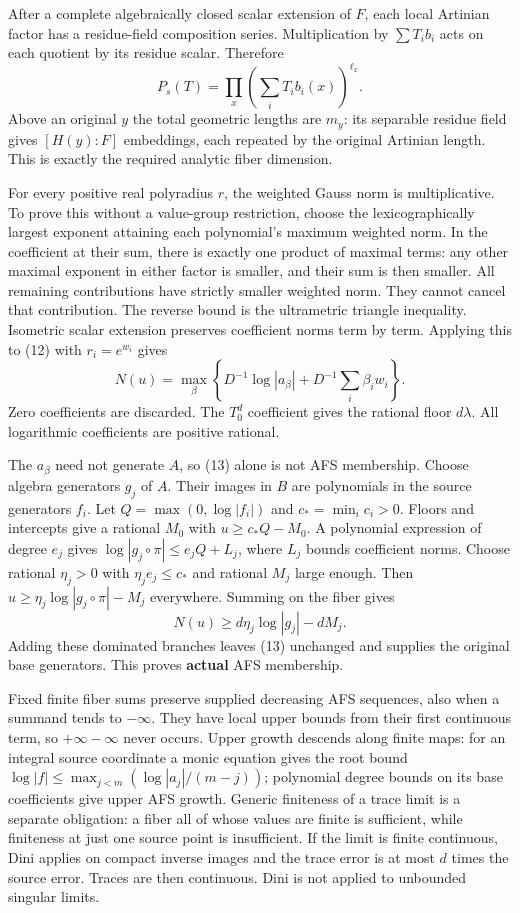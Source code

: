 \documentclass[
  11pt,
]{article}
\begin{document}
After a complete algebraically closed scalar extension of \(F\), each
local Artinian factor has a residue-field composition series.
Multiplication by \(\sum T_i b_i\) acts on each quotient by its residue
scalar. Therefore
\[P_s(T)=\prod_x\left(\sum_iT_i b_i(x)\right)^{\ell_x}.\] Above an
original \(y\) the total geometric lengths are \(m_y\): its separable
residue field gives \([H(y):F]\) embeddings, each repeated by the
original Artinian length. This is exactly the required analytic fiber
dimension.

For every positive real polyradius \(r\), the weighted Gauss norm is
multiplicative. To prove this without a value-group restriction, choose
the lexicographically largest exponent attaining each polynomial's
maximum weighted norm. In the coefficient at their sum, there is exactly
one product of maximal terms: any other maximal exponent in either
factor is smaller, and their sum is then smaller. All remaining
contributions have strictly smaller weighted norm. They cannot cancel
that contribution. The reverse bound is the ultrametric triangle
inequality. Isometric scalar extension preserves coefficient norms term
by term. Applying this to (12) with \(r_i=e^{w_i}\) gives \[
 N(u)=\max_\beta\left\{D^{-1}\log|a_\beta|
                         +D^{-1}\sum_i\beta_iw_i\right\}.              \tag{13}
\] Zero coefficients are discarded. The \(T_0^d\) coefficient gives the
rational floor \(d\lambda\). All logarithmic coefficients are positive
rational.

The \(a_\beta\) need not generate \(A\), so (13) alone is not AFS
membership. Choose algebra generators \(g_j\) of \(A\). Their images in
\(B\) are polynomials in the source generators \(f_i\). Let
\(Q=\max(0,\log|f_i|)\) and \(c_* =\min_i c_i>0\). Floors and intercepts
give a rational \(M_0\) with \(u\ge c_*Q-M_0\). A polynomial expression
of degree \(e_j\) gives \(\log|g_j\circ\pi|\le e_jQ+L_j\), where \(L_j\)
bounds coefficient norms. Choose rational \(\eta_j>0\) with
\(\eta_je_j\le c_*\) and rational \(M_j\) large enough. Then
\(u\ge\eta_j\log|g_j\circ\pi|-M_j\) everywhere. Summing on the fiber
gives \[N(u)\ge d\eta_j\log|g_j|-dM_j.\] Adding these dominated branches
leaves (13) unchanged and supplies the original base generators. This
proves \textbf{actual} AFS membership.

Fixed finite fiber sums preserve supplied decreasing AFS sequences, also
when a summand tends to \(-\infty\). They have local upper bounds from
their first continuous term, so \(+\infty-\infty\) never occurs. Upper
growth descends along finite maps: for an integral source coordinate a
monic equation gives the root bound
\(\log|f|\le\max_{j<m}(\log|a_j|/(m-j))\); polynomial degree bounds on
its base coefficients give upper AFS growth. Generic finiteness of a
trace limit is a separate obligation: a fiber all of whose values are
finite is sufficient, while finiteness at just one source point is
insufficient. If the limit is finite continuous, Dini applies on compact
inverse images and the trace error is at most \(d\) times the source
error. Traces are then continuous. Dini is not applied to unbounded
singular limits.
\end{document}
